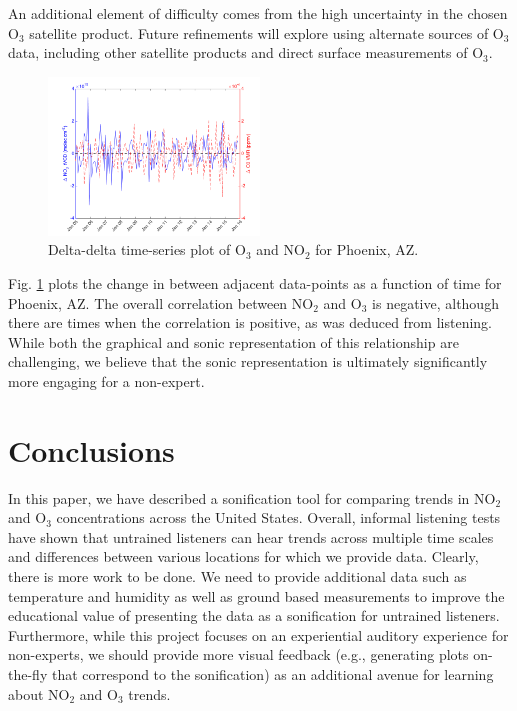 \documentclass[a4paper,10pt,oneside]{article}
\newcommand{\ce}[1]{$\mathrm{#1}$}
\begin{document}
\begin{sloppy}
	An additional element of difficulty comes from the high uncertainty in the chosen \ce{O_3} satellite product. Future refinements will explore using alternate sources of \ce{O_3} data, including other satellite products and direct surface measurements of \ce{O_3}.
	
	\begin{figure}
	\centering
	\includegraphics[width=0.5\textwidth]{figs/delta-delta-timeser-phoenix_AZ.png} 
	\caption{Delta-delta time-series plot of \ce{O_3} and \ce{NO_2} for Phoenix, AZ.}
	\label{fig:del-del}
	\end{figure}
	
	Fig. \ref{fig:del-del} plots the change in  between adjacent data-points as a function of time for Phoenix, AZ. The overall correlation between \ce{NO_2} and \ce{O_3} is negative, although there are times when the correlation is positive, as was deduced from listening. While both the graphical and sonic representation of this relationship are challenging, we believe that the sonic representation is ultimately significantly more engaging for a non-expert.

\section{Conclusions}
In this paper, we have described a sonification tool for comparing trends in \ce{NO_2} and \ce{O_3} concentrations across the United States.  Overall, informal listening tests have shown that untrained listeners can  hear trends across multiple time scales and differences between various locations for which we provide data.  Clearly, there is more work to be done. We need to provide additional data such as temperature and humidity as well as ground based measurements to improve the educational value of presenting the data as a sonification for untrained listeners.  Furthermore, while this project focuses on an experiential auditory experience for non-experts, we should provide more visual feedback (e.g., generating plots on-the-fly that correspond to the sonification) as an additional avenue for learning about \ce{NO_2} and \ce{O_3} trends.  



\end{sloppy}
\end{document}
